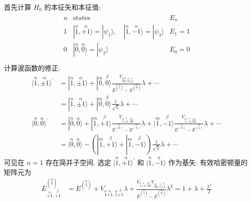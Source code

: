 \documentclass[../../main.tex]{subfiles}
\begin{document}
\begin{enumerate}
\begin{enumerate}
{{    首先计算 $H_{0}$ 的本征矢和本征值:
    \begin{align*}
        \begin{matrix}
            n & \text{states} & E_{n}\\
            1 & |\stackrel{n}{1}, \stackrel{\alpha}{+1}\rangle = |\psi_{1}\rangle,\quad |\stackrel{n}{1},\stackrel{\alpha}{-1}\rangle = |\psi_{3}\rangle & E_{1} = 1\\
            0 & |\stackrel{n}{0},\stackrel{\alpha}{0}\rangle = |\psi_{2}\rangle & E_{0} = 0\\
        \end{matrix}
    \end{align*}
    计算波函数的修正:
    \begin{align*}
        |\stackrel{n}{1},\stackrel{\alpha}{\pm 1}\rangle^{\prime} &= |\stackrel{n}{1},\stackrel{\alpha}{\pm 1}\rangle 
        + |\stackrel{m}{0},\stackrel{\beta}{0}\rangle\frac{V_{\stackrel{m}{0}\stackrel{\beta}{0},\stackrel{n}{0}\stackrel{\alpha}{\pm 1}}}{E^{(\stackrel{n}{1})} - E^{(\stackrel{m}{0})}}\lambda + \cdots\\
        &= |\stackrel{n}{1},\stackrel{\alpha}{\pm 1}\rangle + |\stackrel{m}{0},\stackrel{\beta}{0}\rangle\frac{1}{\sqrt{2}}\lambda + \cdots\\
        |\stackrel{n}{0},\stackrel{\alpha}{0}\rangle^{\prime} &= |\stackrel{n}{0},\stackrel{\alpha}{0}\rangle
        + |\stackrel{m}{1},\stackrel{\beta}{+1}\rangle\frac{V_{\stackrel{m}{1}\stackrel{\beta}{+1}, \stackrel{n}{0}\stackrel{\alpha}{0}}}{E^{\stackrel{n}{(0)}} - E^{\stackrel{m}{(1)}}}\lambda
        + |\stackrel{m}{1},\stackrel{\beta}{-1}\rangle\frac{V_{\stackrel{m}{1}\stackrel{\beta}{-1}, \stackrel{n}{0}\stackrel{\alpha}{0}}}{E^{\stackrel{n}{(0)}} - E^{\stackrel{m}{(1)}}}\lambda + \cdots\\
        &= |\stackrel{n}{0},\stackrel{\alpha}{0}\rangle
         - (|\stackrel{m}{1},\stackrel{\beta}{+1}\rangle + |\stackrel{m}{1},\stackrel{\beta}{-1}\rangle)\frac{1}{\sqrt{2}}\lambda + \cdots
    \end{align*}
    可见在 $n=1$ 存在简并子空间. 选定 $|\stackrel{n}{1},\stackrel{\alpha}{+1}\rangle^{\prime}$ 和 $|\stackrel{n}{1},\stackrel{\alpha}{-1}\rangle$ 作为基矢. 有效哈密顿量的矩阵元为
    \begin{align*}
        E^{(\stackrel{n}{1})}_{\stackrel{\alpha}{+1},\stackrel{\beta}{+1}} &= 
        E^{(\stackrel{n}{1})} 
        + V_{\stackrel{n}{1}\stackrel{\alpha}{+1},\stackrel{n}{1}\stackrel{\beta}{+1}}\lambda 
        + \frac{V_{\stackrel{n}{1}\stackrel{\alpha}{+1},\stackrel{m}{0}\stackrel{\gamma}{0}}V_{\stackrel{m}{0}\stackrel{\gamma}{0},\stackrel{n}{1}\stackrel{\beta}{+1}}}{E^{(\stackrel{n}{1})} - E^{(\stackrel{m}{0})}}\lambda^{2} = 1 + \lambda + \frac{\lambda^{2}}{2}\\

\end{align*}}}
\end{enumerate}
\end{enumerate}
\end{document}
